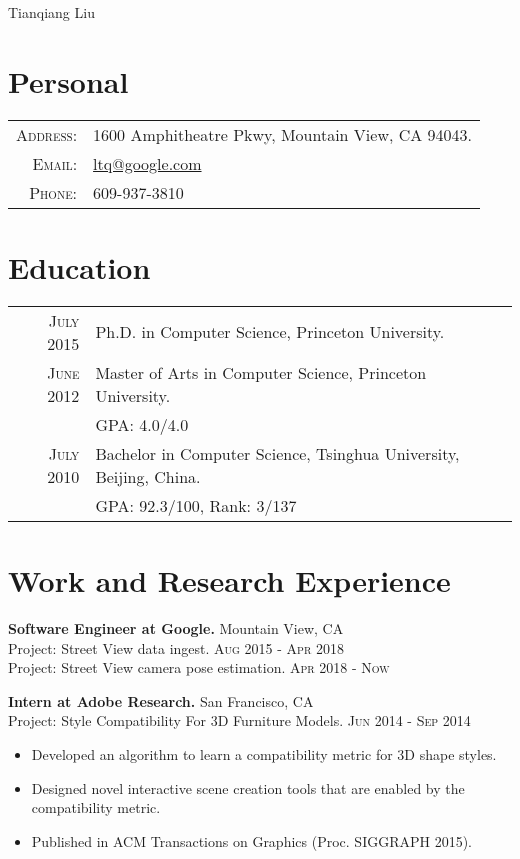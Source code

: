 \documentclass[letterpaper,10pt]{article}
\begin{document}
\pagestyle{empty}

\par{\centering
{\huge Tianqiang Liu }
\bigskip\par}

\section{Personal}
\begin{tabular}{rl}
\textsc{Address:} & 1600 Amphitheatre Pkwy, Mountain View, CA 94043.\\
\textsc{Email:}	& \href{mailto:ltq@google.com}{ltq@google.com}\\
\textsc{Phone:} & 609-937-3810
\end{tabular}

\section{Education}
\begin{tabular}{rl}
\textsc{July} 2015
  & Ph.D. in Computer Science, Princeton University.
\vspace{0.05in}\\

\textsc{June} 2012 
  & Master of Arts in Computer Science, Princeton University.\\
  & GPA: 4.0/4.0
\vspace{0.05in}\\

\textsc{July} 2010
  & Bachelor in Computer Science, Tsinghua University, Beijing, China.\\
  & GPA: 92.3/100, Rank: 3/137 \\
\end{tabular}

\section{Work and Research Experience}
\textbf{Software Engineer at Google.}  \hfill Mountain View, CA\\
Project: Street View data ingest. \hfill \textsc{Aug} 2015 - \textsc{Apr} 2018 \\
Project: Street View camera pose estimation. \hfill \textsc{Apr} 2018 - \textsc{Now}
\vspace{0.06in}

\textbf{Intern at Adobe Research.}  \hfill San Francisco, CA\\
Project: Style Compatibility For 3D Furniture Models.  \hfill \textsc{Jun} 2014 - \textsc{Sep} 2014
\begin{itemize}
    \item Developed an algorithm to learn a compatibility metric for 3D shape styles.
    \item Designed novel interactive scene creation tools that are enabled by the compatibility metric.
    \item Published in ACM Transactions on Graphics (Proc. SIGGRAPH 2015).
\end{itemize}
\vspace{0.06in}
\end{document}
